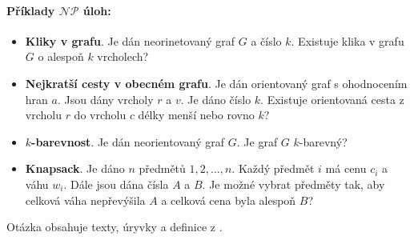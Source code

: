 \paragraph{Příklady $\mathcal{NP}$ úloh:}
\begin{itemize}[itemsep=0pt]
    \item \textbf{\color{darkBrown}Kliky v grafu}. Je dán neorinetovaný graf $G$ a číslo $k$. Existuje klika v grafu $G$ o alespoň $k$ vrcholech?
    
    \item \textbf{\color{darkBrown}Nejkratší cesty v obecném grafu}. Je dán orientovaný graf s ohodnocením hran $a$. Jsou dány vrcholy $r$ a $v$. Je dáno číslo $k$. Existuje orientovaná cesta z vrcholu $r$ do vrcholu $c$ délky menší nebo rovno $k$?
    
    \item \textbf{\color{darkBrown}$k$-barevnost}. Je dán neorientovaný graf $G$. Je graf $G$ $k$-barevný?    
    \item \textbf{\color{darkBrown}Knapsack}. Je dáno $n$ předmětů $1,2, \dots, n$. Každý předmět $i$ má cenu $c_i$ a váhu $w_i$. Dále jsou dána čísla $A$ a $B$. Je možné vybrat předměty tak, aby celková váha nepřevýšila $A$ a celková cena byla alespoň $B$?
\end{itemize}

Otázka obsahuje texty, úryvky a definice z \cite{tal:demlova}.
